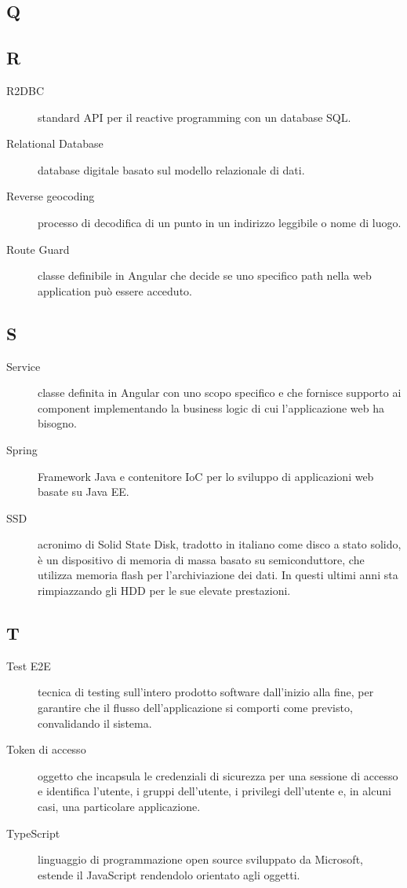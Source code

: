 \documentclass[../manuale-manutentore.tex]{subfiles}
\begin{document}
\subsection{Q}

\subsection{R}

\begin{description}
    \item[R2DBC] standard API per il reactive programming con un database SQL\@.
    \item[Relational Database] database digitale basato sul modello relazionale di dati.
    \item[Reverse geocoding] processo di decodifica di un punto in un indirizzo leggibile o nome di luogo.
    \item[Route Guard] classe definibile in Angular che decide se uno specifico path nella web application può essere acceduto.
\end{description}

\subsection{S}

\begin{description}
    \item[Service] classe definita in Angular con uno scopo specifico e che fornisce supporto ai component implementando la business logic di cui l'applicazione web ha bisogno.
    \item[Spring] Framework Java e contenitore IoC per lo sviluppo di applicazioni web basate su Java EE\@.
    \item[SSD] acronimo di Solid State Disk, tradotto in italiano come disco a stato solido, è un dispositivo di memoria di massa basato su semiconduttore, che utilizza memoria flash per l'archiviazione dei dati. In questi ultimi anni sta rimpiazzando gli HDD per le sue elevate prestazioni.
\end{description}

\subsection{T}

\begin{description}
    \item[Test E2E] tecnica di testing sull'intero prodotto software dall'inizio alla fine, per garantire che il flusso dell'applicazione si comporti come previsto, convalidando il sistema.
    \item[Token di accesso] oggetto che incapsula le credenziali di sicurezza per una sessione di accesso e identifica l'utente, i gruppi dell'utente, i privilegi dell'utente e, in alcuni casi, una particolare applicazione.
    \item[TypeScript] linguaggio di programmazione open source sviluppato da Microsoft, estende il JavaScript rendendolo orientato agli oggetti.
\end{description}
\end{document}
